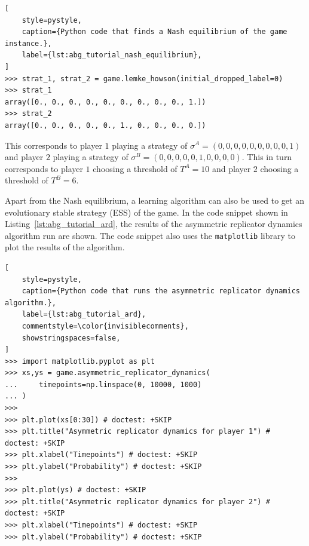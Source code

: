 \begin{lstlisting}[
    style=pystyle,
    caption={Python code that finds a Nash equilibrium of the game instance.},
    label={lst:abg_tutorial_nash_equilibrium},
]
>>> strat_1, strat_2 = game.lemke_howson(initial_dropped_label=0)
>>> strat_1
array([0., 0., 0., 0., 0., 0., 0., 0., 0., 1.])
>>> strat_2
array([0., 0., 0., 0., 0., 1., 0., 0., 0., 0.])

\end{lstlisting}

This corresponds to player \(1\) playing a strategy of
\(\sigma^A = (0, 0, 0, 0, 0, 0, 0, 0, 0, 1)\) and player \(2\) playing a
strategy of \(\sigma^B = (0, 0, 0, 0, 0, 1, 0, 0, 0, 0)\).
This in turn corresponds to player \(1\) choosing a threshold of \(T^A = 10\)
and player \(2\) choosing a threshold of \(T^B = 6\).

Apart from the Nash equilibrium, a learning algorithm can also be used to get
an evolutionary stable strategy (ESS) of the game.
In the code snippet shown in Listing~\ref{lst:abg_tutorial_ard}, the results
of the asymmetric replicator dynamics algorithm run are shown.
The code snippet also uses the \texttt{matplotlib} library to plot the
results of the algorithm.


\begin{lstlisting}[
    style=pystyle,
    caption={Python code that runs the asymmetric replicator dynamics algorithm.},
    label={lst:abg_tutorial_ard},
    commentstyle=\color{invisiblecomments},
    showstringspaces=false,
]
>>> import matplotlib.pyplot as plt
>>> xs,ys = game.asymmetric_replicator_dynamics(
...     timepoints=np.linspace(0, 10000, 1000)
... )
>>>
>>> plt.plot(xs[0:30]) # doctest: +SKIP
>>> plt.title("Asymmetric replicator dynamics for player 1") # doctest: +SKIP
>>> plt.xlabel("Timepoints") # doctest: +SKIP
>>> plt.ylabel("Probability") # doctest: +SKIP
>>>
>>> plt.plot(ys) # doctest: +SKIP
>>> plt.title("Asymmetric replicator dynamics for player 2") # doctest: +SKIP
>>> plt.xlabel("Timepoints") # doctest: +SKIP
>>> plt.ylabel("Probability") # doctest: +SKIP
    
\end{lstlisting}

